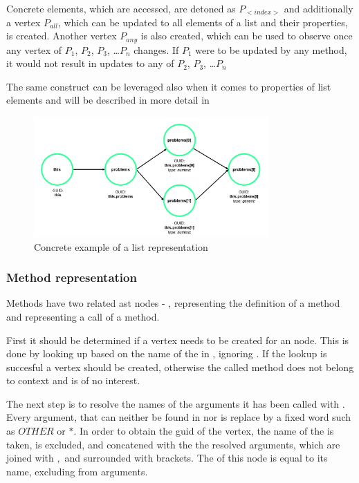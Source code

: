 Concrete elements, which are accessed, are detoned as $P_{<index>}$ and additionally a vertex $P_{all}$, which can be updated to all elements of a list and their properties, is created. Another vertex $P_{any}$ is also created, which can be used to observe once any vertex of $P_1$, $P_2$, $P_3$, \dots $P_n$ changes. If $P_1$ were to be updated by any method, it would not result in updates to any of $P_2$, $P_3$, \dots $P_n$


The same construct can be leveraged also when it comes to properties of list elements and will be described in more detail in %

\begin{figure}[H]
    \includegraphics[width=0.8\textwidth]{images/graph_list.png}
     \caption{Concrete example of a list representation}
     \label{fig:graph_list}
\end{figure}

\subsubsection{Method representation}
\label{concept:methods}
Methods have two related \gls{ast} nodes - , representing the definition of a method and  representing a call of a method. 

First it should be determined if a vertex needs to be created for an  node. This is done by looking up based on the name of the  in , ignoring . If the lookup is succesful a vertex should be created, otherwise the called method does not belong to context and is of no interest.

The next step is to resolve the names of the arguments it has been called with . Every argument, that can neither be found in  nor  is replace by a fixed word such as $OTHER$ or $*$. In order to obtain the \gls{guid} of the vertex, the name of the  is taken,  is excluded, and concatened with the the resolved arguments, which are joined with $,$ and surrounded with brackets. The  of this node is equal to its name, excluding  from arguments. 

